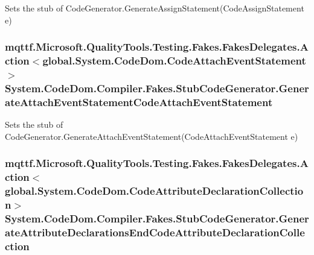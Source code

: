 Sets the stub of Code\-Generator.\-Generate\-Assign\-Statement(\-Code\-Assign\-Statement e)

\hypertarget{class_system_1_1_code_dom_1_1_compiler_1_1_fakes_1_1_stub_code_generator_a7a7abb4023e68385e331a324e068f5cd}{
\subsubsection[{Generate\-Attach\-Event\-Statement\-Code\-Attach\-Event\-Statement}]{\setlength{\rightskip}{0pt plus 5cm}mqttf.\-Microsoft.\-Quality\-Tools.\-Testing.\-Fakes.\-Fakes\-Delegates.\-Action$<$global.\-System.\-Code\-Dom.\-Code\-Attach\-Event\-Statement$>$ System.\-Code\-Dom.\-Compiler.\-Fakes.\-Stub\-Code\-Generator.\-Generate\-Attach\-Event\-Statement\-Code\-Attach\-Event\-Statement}}\label{class_system_1_1_code_dom_1_1_compiler_1_1_fakes_1_1_stub_code_generator_a7a7abb4023e68385e331a324e068f5cd}


Sets the stub of Code\-Generator.\-Generate\-Attach\-Event\-Statement(\-Code\-Attach\-Event\-Statement e)

\hypertarget{class_system_1_1_code_dom_1_1_compiler_1_1_fakes_1_1_stub_code_generator_ae02c5c3fc4b110a3729c66ad85f4dec9}{
\subsubsection[{Generate\-Attribute\-Declarations\-End\-Code\-Attribute\-Declaration\-Collection}]{\setlength{\rightskip}{0pt plus 5cm}mqttf.\-Microsoft.\-Quality\-Tools.\-Testing.\-Fakes.\-Fakes\-Delegates.\-Action$<$global.\-System.\-Code\-Dom.\-Code\-Attribute\-Declaration\-Collection$>$ System.\-Code\-Dom.\-Compiler.\-Fakes.\-Stub\-Code\-Generator.\-Generate\-Attribute\-Declarations\-End\-Code\-Attribute\-Declaration\-Collection}}\label{class_system_1_1_code_dom_1_1_compiler_1_1_fakes_1_1_stub_code_generator_ae02c5c3fc4b110a3729c66ad85f4dec9}


